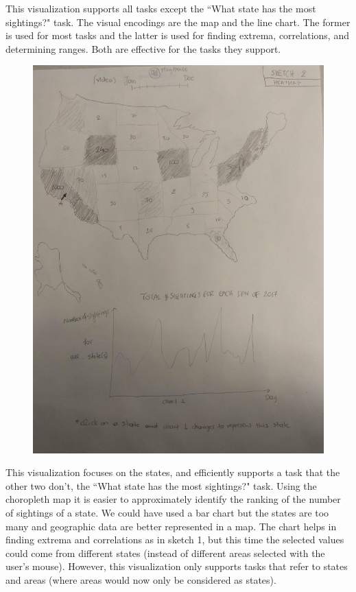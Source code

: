 \documentclass{neu_handout}
\begin{document}
This visualization supports all tasks except the ``What state has the most sightings?" task. The visual encodings are the map and the line chart. The former is used for most tasks and the latter is used for finding extrema, correlations, and determining ranges. Both are effective for the tasks they support.

\newpage

\begin{figure}[h]
\centering
{
\includegraphics[width=0.7\linewidth]{lydia2}
}
\end{figure}

This visualization focuses on the states, and efficiently supports a task that the other two don't, the ``What state has the most sightings?" task. Using the choropleth map it is easier to approximately identify the ranking of the number of sightings of a state. We could have used a bar chart but the states are too many and geographic data are better represented in a map. The chart helps in finding extrema and correlations as in sketch 1, but this time the selected values could come from different states (instead of different areas selected with the user's mouse). However, this visualization only supports tasks that refer to states and areas (where areas would now only be considered as states).

\newpage
\end{document}
